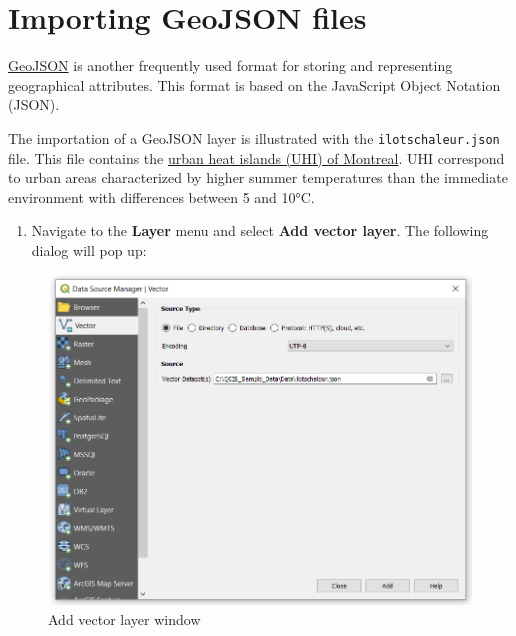 \documentclass[]{book}
\providecommand{\tightlist}{%
  \setlength{\itemsep}{0pt}\setlength{\parskip}{0pt}}
\theoremstyle{definition}
\theoremstyle{definition}
\theoremstyle{definition}
\theoremstyle{remark}
\begin{document}
\section{Importing GeoJSON files}\label{importing-geojson-files}

\href{https://geojson.org/}{GeoJSON} is another frequently used format
for storing and representing geographical attributes. This format is
based on the JavaScript Object Notation (JSON).

The importation of a GeoJSON layer is illustrated with the
\texttt{ilotschaleur.json} file. This file contains the
\href{http://donnees.ville.montreal.qc.ca/dataset/schema-environnement-milieux-naturels/resource/8cd8d34a-cfdd-4acf-a363-d4adaeff18c0}{urban
heat islands (UHI) of Montreal}. UHI correspond to urban areas
characterized by higher summer temperatures than the immediate
environment with differences between 5 and 10°C.

\begin{enumerate}
\def\labelenumi{\arabic{enumi}.}
\tightlist
\item
  Navigate to the \textbf{Layer} menu and select \textbf{Add vector
  layer}. The following dialog will pop up:
\end{enumerate}

\begin{figure}

{\centering \includegraphics[width=12.12in]{figures/Import_geojson} 

}

\caption{Add vector layer window}\label{fig:unnamed-chunk-7}
\end{figure}
\end{document}
